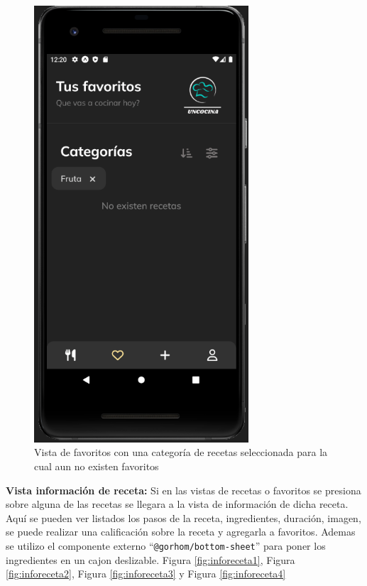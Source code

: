 \begin{figure}[!h]
  \centering
  \includegraphics[width=8cm, scale=1]{Images/Imagenes/favoritos2.png}
  \caption{Vista de favoritos con una categoría de recetas seleccionada para la cual aun no existen favoritos}
  \label{fig:favoritos2}
\end{figure}

\textbf{Vista información de receta: }
Si en las vistas de recetas o favoritos se presiona sobre alguna de las recetas se llegara a la vista de información de dicha receta. Aquí se pueden ver listados los pasos de la receta, ingredientes, duración, imagen, se puede realizar una calificación sobre la receta y agregarla a favoritos. Ademas se utilizo el componente externo ``\texttt{@gorhom/bottom-sheet}'' para poner los ingredientes en un cajon deslizable. Figura \ref{fig:inforeceta1}, Figura \ref{fig:inforeceta2}, Figura \ref{fig:inforeceta3} y Figura \ref{fig:inforeceta4}\\

